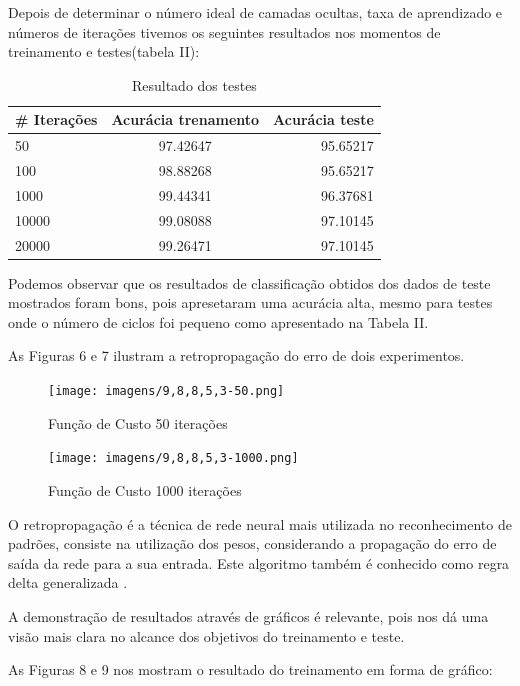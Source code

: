 \documentclass[conference]{IEEEtran}
\begin{document}
  Depois de determinar o número ideal de camadas ocultas, taxa de aprendizado e números de iterações tivemos os seguintes resultados nos momentos de treinamento e testes(tabela II):
     
    \begin{table}[h]
	\caption{Resultado dos testes}
	\begin{center}
    \begin{tabular}{l | c | r }
    \hline
         \# Iterações &Acurácia trenamento  & Acurácia teste \\\hline
         50 &97.42647  &95.65217    \\\hline
         100 &98.88268  &95.65217    \\\hline
         1000 &99.44341  &96.37681    \\\hline
         10000 &99.08088  &97.10145   \\\hline
         20000 &99.26471  &97.10145  \\\hline
    \end{tabular}
    \end{center}
    \end{table}
     
    
    Podemos observar que os resultados de classificação obtidos dos dados de teste mostrados foram bons, pois apresetaram uma acurácia alta, mesmo para testes onde o número de ciclos foi pequeno como apresentado na Tabela II.
    
    As Figuras 6 e 7 ilustram a retropropagação do erro de dois experimentos.
    
    \begin{figure}[htbp]
	\centerline{\texttt{[image: imagens/9,8,8,5,3-50.png]}}
	\caption{Função de Custo 50 iterações}
	
	\centerline{\texttt{[image: imagens/9,8,8,5,3-1000.png]}}
	\caption{Função de Custo 1000 iterações}
	\label{fig}
	\end{figure}
	
	 O retropropagação é a técnica de rede neural mais utilizada no reconhecimento de padrões, consiste na utilização dos pesos, considerando a propagação do erro de saída da rede para a sua entrada. Este algoritmo também é conhecido como regra delta generalizada \cite{b12} \cite{b13}. 
	 
	 A demonstração de resultados através de gráficos é relevante, pois nos dá uma visão mais clara no alcance dos objetivos do treinamento e teste. 
	 
	 As Figuras 8 e 9 nos mostram o resultado do treinamento em forma de gráfico:
	 
\end{document}
